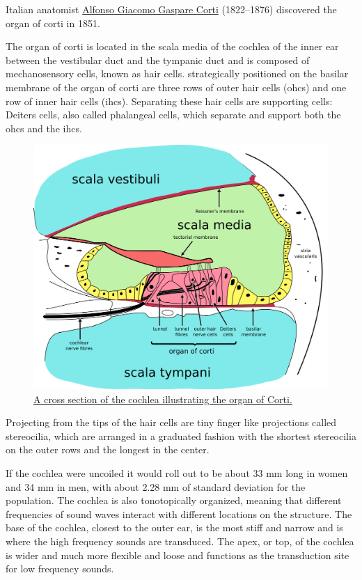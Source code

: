 Italian anatomist \href{https://en.wikipedia.org/wiki/Alfonso_Giacomo_Gaspare_Corti}{Alfonso Giacomo Gaspare Corti} (1822--1876) discovered the organ of corti in 1851.

The organ of corti is located in the scala media of the cochlea of the inner ear between the vestibular duct and the tympanic duct and is composed of mechanosensory cells, known as hair cells. strategically positioned on the basilar membrane of the organ of corti are three rows of outer hair cells (ohcs) and one row of inner hair cells (ihcs). Separating these hair cells are supporting cells: Deiters cells, also called phalangeal cells, which separate and support both the ohcs and the ihcs.



\begin{figure}

{\centering \includegraphics[width=0.7\linewidth]{./figures/auditory/Cochlea-crosssection} 

}

\caption{\href{https://commons.wikimedia.org/wiki/File:Cochlea-crosssection.svg}{A cross section of the cochlea illustrating the organ of Corti.}}\label{fig:organcorti}
\end{figure}

Projecting from the tips of the hair cells are tiny finger like projections called stereocilia, which are arranged in a graduated fashion with the shortest stereocilia on the outer rows and the longest in the center.

If the cochlea were uncoiled it would roll out to be about 33 mm long in women and 34 mm in men, with about 2.28 mm of standard deviation for the population. The cochlea is also tonotopically organized, meaning that different frequencies of sound waves interact with different locations on the structure. The base of the cochlea, closest to the outer ear, is the most stiff and narrow and is where the high frequency sounds are transduced. The apex, or top, of the cochlea is wider and much more flexible and loose and functions as the transduction site for low frequency sounds.

